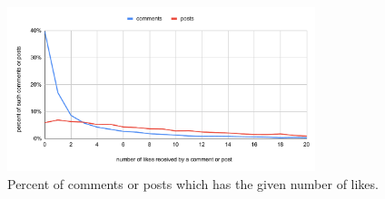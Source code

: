 \documentclass[
	11pt
] {article}
\begin{document}
	\begin{figure}[H]
		\centering
		\includegraphics[width=0.8\textwidth]{fig-proportion-of-posts-or-comments-with-certain-likes}
		\caption{Percent of comments or posts which has the given number of likes.}
		\label{fig-proportion-of-posts-or-comments-with-certain-likes}
	\end{figure}
\end{document}
